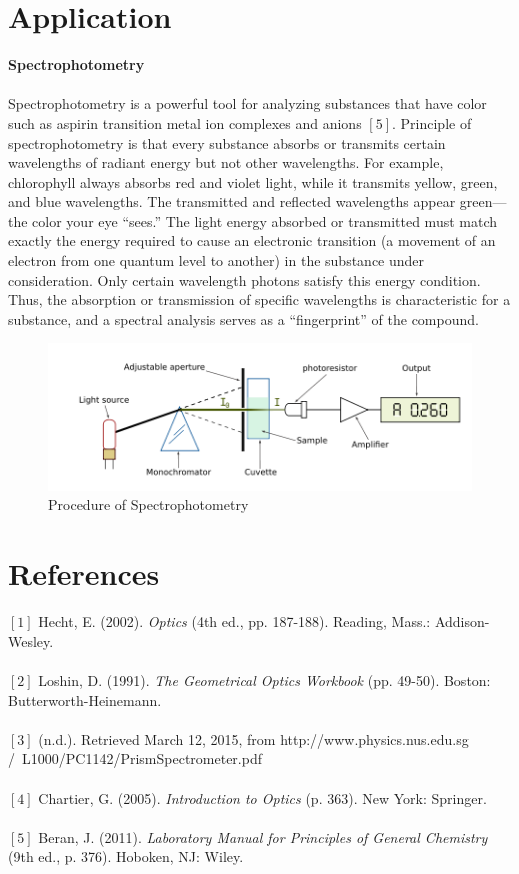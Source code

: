 \documentclass[a4paper,12pt]{report}
\begin{document}
\chapter{Application}
\textbf{Spectrophotometry}\\\\
Spectrophotometry is a powerful tool for analyzing substances that have color such as aspirin transition metal ion complexes and
anions $[5]$. Principle of spectrophotometry is that every substance absorbs
or transmits certain wavelengths of radiant energy but not other wavelengths.
For example, chlorophyll always absorbs red and violet light, while it transmits
yellow, green, and blue wavelengths. The transmitted and reflected wavelengths
appear green—the color your eye “sees.” The light energy absorbed
or transmitted must match exactly the energy required to cause an electronic
transition (a movement of an electron from one quantum level to another) in
the substance under consideration. Only certain wavelength photons satisfy
this energy condition. Thus, the absorption or transmission of specific wavelengths
is characteristic for a substance, and a spectral analysis serves as a
“fingerprint” of the compound.
\begin{figure}[h]
\centering
\includegraphics[width=0.90\linewidth, height=0.25\textheight]{Spectrophotometry}
\caption{Procedure of Spectrophotometry}
\label{fig:Spectrophotometry}
\end{figure}














\chapter{References}
$[1]$ Hecht, E. (2002). \textit{Optics} (4th ed., pp. 187-188). Reading, Mass.: Addison-Wesley.\\\\
$[2]$ Loshin, D. (1991). \textit{The Geometrical Optics Workbook} (pp. 49-50). Boston: Butterworth-Heinemann.\\\\
$[3]$ (n.d.). Retrieved March 12, 2015, from http://www.physics.nus.edu.sg\\/~L1000/PC1142/PrismSpectrometer.pdf\\\\
$[4]$ Chartier, G. (2005). \textit{Introduction to Optics} (p. 363). New York: Springer.\\\\
$[5]$ Beran, J. (2011). \textit{Laboratory Manual for Principles of General Chemistry} (9th ed., p. 376). Hoboken, NJ: Wiley.
\end{document}
